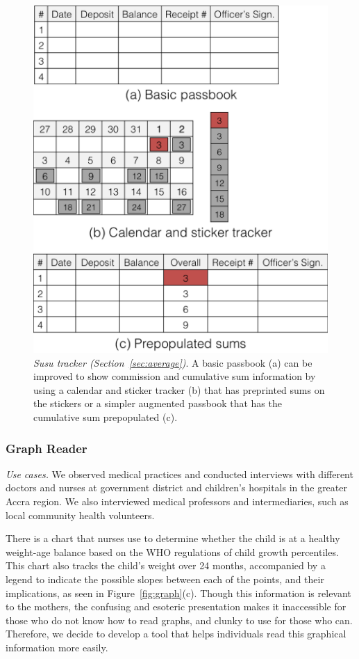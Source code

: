 \documentclass{sig-alternate}
\begin{document}
\begin{figure}
\centering
\includegraphics[width=.75\linewidth]{img/susu.png}
\caption{\emph{Susu tracker (Section~\ref{sec:average})}. A basic passbook (a) can be improved to show commission and cumulative sum information by using a calendar and sticker tracker (b) that has preprinted sums on the stickers or a simpler augmented passbook that has the cumulative sum prepopulated (c).}
\label{fig:susu}
\end{figure}

\subsubsection{Graph Reader}
\label{sec:graph}

\emph{Use cases.}
We observed medical practices and conducted interviews with different doctors and nurses at government district and children's hospitals in the greater Accra region. We also interviewed medical professors and intermediaries, such as local community health volunteers. 

There is a chart that nurses use to determine whether the child is at a healthy weight-age balance based on the WHO regulations of child growth percentiles. This chart also tracks the child's weight over 24 months, accompanied by a legend to indicate the possible slopes between each of the points, and their implications, as seen in Figure~\ref{fig:graph}(c). Though this information is relevant to the mothers, the confusing and esoteric presentation makes it inaccessible for those who do not know how to read graphs, and clunky to use for those who can. Therefore, we decide to develop a tool that helps individuals read this graphical information more easily.
\end{document}
